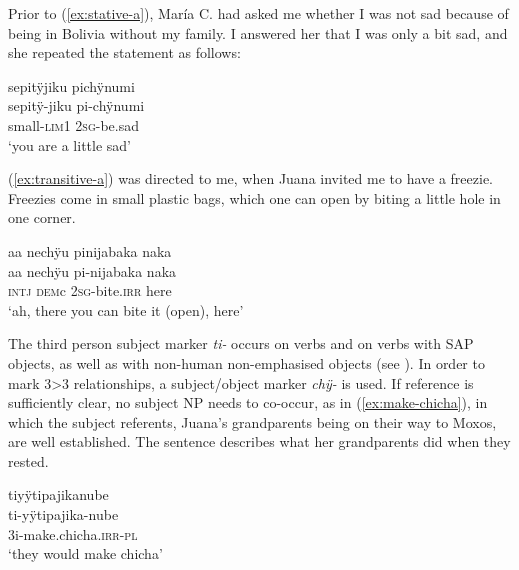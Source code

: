 Prior to (\ref{ex:stative-a}), María C. had asked me whether I was not sad because of being in Bolivia without my family. I answered her that I was only a bit sad, and she repeated the statement as follows:

\ea\label{ex:stative-a}
\begingl 
\glpreamble sepitÿjiku pichÿnumi\\
\gla sepitÿ-jiku pi-chÿnumi\\ 
\glb small-\textsc{lim}1 2\textsc{sg}-be.sad\\ 
\glft ‘you are a little sad’
\trailingcitation{[uxx-e120427l.052]}
\xe


(\ref{ex:transitive-a}) was directed to me, when Juana invited me to have a freezie. Freezies come in small plastic bags, which one can open by biting a little hole in one corner.

\ea\label{ex:transitive-a}
\begingl
\glpreamble aa nechÿu pinijabaka naka\\
\gla aa nechÿu pi-nijabaka naka\\
\glb \textsc{intj} \textsc{dem}c 2\textsc{sg}-bite.\textsc{irr} here\\
\glft ‘ah, there you can bite it (open), here’
\endgl
\trailingcitation{[jxx-e110923l-2.103]}
\xe

The third person subject marker \textit{ti-} occurs on  verbs and on  verbs with SAP objects, as well as with non-human non-emphasised objects (see ). In order to mark 3>3 relationships, a subject/object marker \textit{chÿ-} is used. If reference is sufficiently clear, no subject NP needs to co-occur, as in (\ref{ex:make-chicha}), in which the subject referents, Juana’s grandparents being on their way to Moxos, are well established. The sentence describes what her grandparents did when they rested.

\ea\label{ex:make-chicha}
\begingl
\glpreamble tiyÿtipajikanube\\
\gla ti-yÿtipajika-nube\\
\glb 3i-make.chicha.\textsc{irr}-\textsc{pl}\\
\glft ‘they would make chicha’
\endgl
\trailingcitation{[jxx-p151016l-2.057]}
\xe
{}


